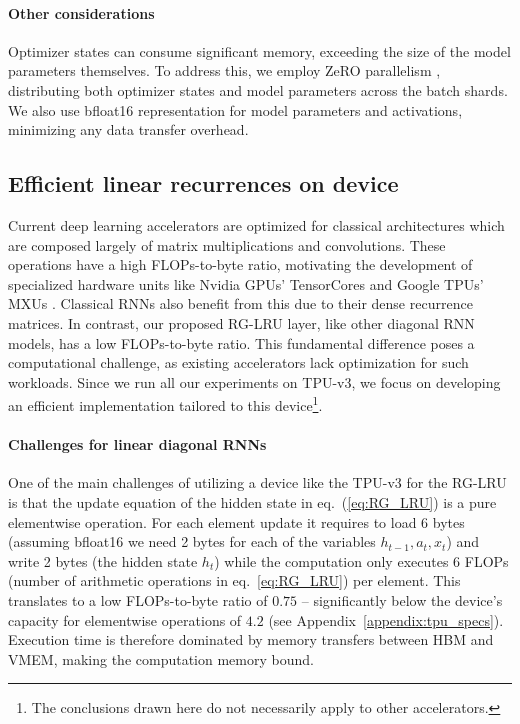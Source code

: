\documentclass[11pt, a4paper, logo, onecolumn]{googledeepmind}
\theoremstyle{definition}
\begin{document}
\paragraph{Other considerations}



Optimizer states can consume significant memory, exceeding the size of the model parameters themselves. 
To address this, we employ ZeRO parallelism \citep{rajbhandari2020zero}, distributing both optimizer states and model parameters across the batch shards. 
We also use bfloat16 representation for model parameters and activations, minimizing any data transfer overhead.



\subsection{Efficient linear recurrences on device}
\label{sec:training_rnn}

Current deep learning accelerators are optimized for classical architectures which are composed largely of matrix multiplications and convolutions. 
These operations have a high FLOPs-to-byte ratio, motivating the development of specialized hardware units like Nvidia GPUs' TensorCores  \citep{markidis2018nvidia} and Google TPUs' MXUs \citep{norrie2021design, jouppi2021ten, jouppi2023tpu}. 
Classical RNNs also benefit from this due to their dense recurrence matrices.
In contrast, our proposed RG-LRU layer, like other diagonal RNN models, has a low FLOPs-to-byte ratio.
This fundamental difference poses a computational challenge, as existing accelerators lack optimization for such workloads. 
Since we run all our experiments on TPU-v3, we focus on developing an efficient implementation tailored to this device\footnote{The conclusions drawn here do not necessarily apply to other accelerators.}.


\paragraph{Challenges for linear diagonal RNNs}

One of the main challenges of utilizing a device like the TPU-v3 for the RG-LRU is that the update equation of the hidden state in eq.~(\ref{eq:RG_LRU}) is a pure elementwise operation.
For each element update it requires to load 6 bytes (assuming bfloat16 we need 2 bytes for each of the variables $h_{t-1}, a_t, x_t$) and write 2 bytes (the hidden state $h_t$) while the computation only executes 6 FLOPs (number of arithmetic operations in eq.~\ref{eq:RG_LRU}) per element. 
This translates to a low FLOPs-to-byte ratio of $0.75$ -- significantly below the device's capacity for elementwise operations of $4.2$ (see Appendix~\ref{appendix:tpu_specs}).
Execution time is therefore dominated by memory transfers between HBM and VMEM, making the computation memory bound.
\end{document}
